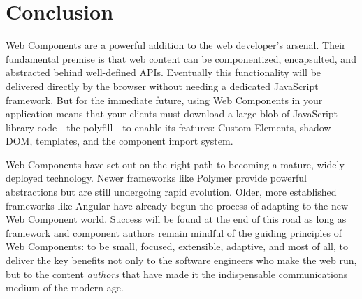 \chapter{Conclusion}
%
\label{ch:conclusion}

Web Components are a powerful addition to the web developer's arsenal. 
Their fundamental premise is that web content can be componentized, encapsulted, and abstracted behind well-defined APIs.
Eventually this functionality will be delivered directly by the browser without needing a dedicated JavaScript framework.
But for the immediate future, using Web Components in your application means that your clients must download a large blob of JavaScript library code---the polyfill---to enable its features: 
Custom Elements, 
shadow DOM, 
templates, and 
the component import system.

Web Components have set out on the right path to becoming a mature, widely deployed technology. 
Newer frameworks like Polymer provide powerful abstractions but are still undergoing rapid evolution.
Older, more established frameworks like Angular have already begun the process of adapting to the new Web Component world. 
Success will be found at the end of this road as long as framework and component authors remain mindful of the guiding principles of Web Components: 
to be small, focused, extensible, adaptive, 
and most of all, 
to deliver the key benefits 
not only to the software engineers who make the web run,
but to the content \textit{authors} that have made it the indispensable communications medium of the modern age.
